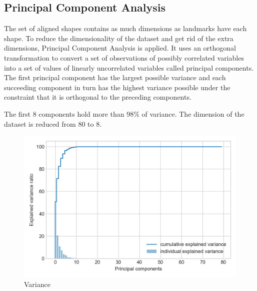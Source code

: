 

\subsection{Principal Component Analysis}
The set of aligned shapes contains as much dimensions as landmarks
have each shape. To reduce the dimensionality of the dataset and
get rid of the extra dimensions, Principal Component Analysis is
applied. It uses an orthogonal transformation to convert a set of
observations of possibly correlated variables into a set of values
of linearly uncorrelated variables called principal components.
The first principal component has the largest possible variance
and each succeeding component in turn has the highest variance
possible under the constraint that it is orthogonal to the
preceding components.

The first 8 components hold more than 98\% of variance. The
dimension of the dataset is reduced from 80 to 8.

\begin{figure}
  \centering
  \includegraphics[width=0.7\linewidth]{img/variance}
  \caption{Variance}
\end{figure}
